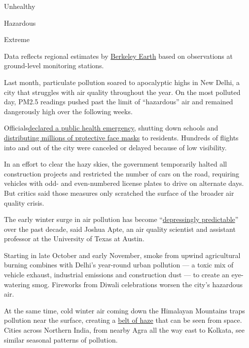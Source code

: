 Unhealthy

Hazardous

Extreme

Data reflects regional estimates by
\href{http://berkeleyearth.org/air-quality-real-time-map/}{Berkeley
Earth} based on observations at ground-level monitoring stations.

Last month, particulate pollution soared to apocalyptic highs in New
Delhi, a city that struggles with air quality throughout the year. On
the most polluted day, PM2.5 readings pushed past the limit of
``hazardous'' air and remained dangerously high over the following
weeks.

Officials\href{https://economictimes.indiatimes.com/news/politics-and-nation/epca-declares-public-health-emergency-in-delhi-ncr/articleshow/71850416.cms}{declared
a public health emergency}, shutting down schools and
\href{https://twitter.com/arvindkejriwal/status/1190124368241795073?lang=en}{distributing
millions of protective face masks} to residents. Hundreds of flights
into and out of the city were canceled or delayed because of low
visibility.

In an effort to clear the hazy skies, the government temporarily halted
all construction projects and restricted the number of cars on the road,
requiring vehicles with odd- and even-numbered license plates to drive
on alternate days. But critics said those measures only scratched the
surface of the broader air quality crisis.

The early winter surge in air pollution has become
``\href{https://twitter.com/joshapte/status/1191110529592496130}{depressingly
predictable}'' over the past decade, said Joshua Apte, an air quality
scientist and assistant professor at the University of Texas at Austin.

Starting in late October and early November, smoke from upwind
agricultural burning combines with Delhi's year-round urban pollution
--- a toxic mix of vehicle exhaust, industrial emissions and
construction dust --- to create an eye-watering smog. Fireworks from
Diwali celebrations worsen the city's hazardous air.

At the same time, cold winter air coming down the Himalayan Mountains
traps pollution near the surface, creating a
\href{https://earthobservatory.nasa.gov/images/41464/haze-along-the-himalaya}{belt
of haze} that can be seen from space. Cities across Northern India, from
nearby Agra all the way east to Kolkata, see similar seasonal patterns
of pollution.

